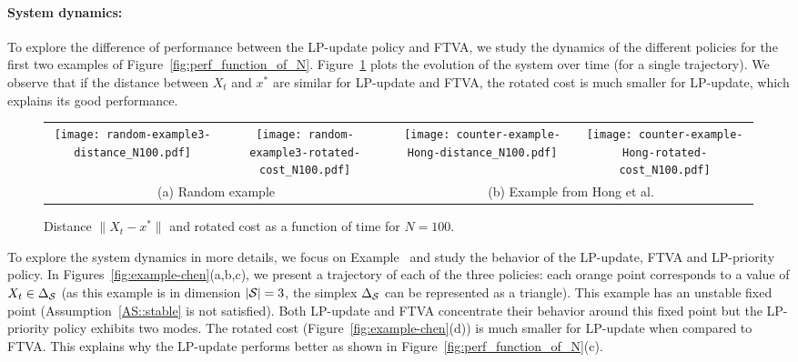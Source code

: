 \paragraph{System dynamics:} To explore the difference of performance between the LP-update policy and FTVA, we study the dynamics of the different policies for the first two examples of Figure~\ref{fig:perf_function_of_N}. %
Figure~\ref{fig:as_function_of_time} %
plots the evolution of the system over time (for a single trajectory). We observe that if the distance between $X_t$ and $x^*$ are similar for LP-update and FTVA, the rotated cost is much smaller for LP-update, which explains its good performance. 
\begin{figure}[ht]
    \centering
    \begin{tabular}{@{}c@{}c@{}@{}c@{}c}
        \texttt{[image: random-example3-distance\_N100.pdf]}
        &\texttt{[image: random-example3-rotated-cost\_N100.pdf]}
        &\texttt{[image: counter-example-Hong-distance\_N100.pdf]}
        &\texttt{[image: counter-example-Hong-rotated-cost\_N100.pdf]}
        \\
        \multicolumn{2}{c}{(a) Random example}
        &\multicolumn{2}{c}{(b) Example from Hong et al.}
    \end{tabular}

    \caption{Distance $\|X_t-x^*\|$ and rotated cost as a function of time for $N=100$.}
    \label{fig:as_function_of_time}
\end{figure}
To explore the system dynamics in more details, we focus on Example~\cite{chen:tel-04068056} and study the behavior of the LP-update, FTVA and LP-priority policy. In Figures~\ref{fig:example-chen}(a,b,c), we present a trajectory of each of the three policies: each orange point corresponds to a value of $X_t\in\Delta_\mathcal{S}$ (as this example is in dimension $|\mathcal{S}|=3$, the simplex $\Delta_\mathcal{S}$ can be represented as a triangle). This example has an unstable fixed point (Assumption~\ref{AS::stable} is not satisfied). Both LP-update and FTVA concentrate their behavior around this fixed point but the LP-priority policy exhibits two modes. %
The rotated cost (Figure~\ref{fig:example-chen}(d)) %
is much smaller for LP-update when compared to FTVA. This explains why the LP-update performs better as shown in Figure~\ref{fig:perf_function_of_N}(c).
